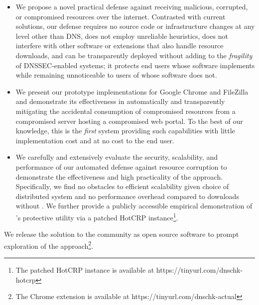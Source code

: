 \begin{itemize}

  \item We propose a novel practical defense against receiving malicious,
  corrupted, or compromised resources over the internet. Contrasted with current
  solutions, our defense requires no source code or infrastructure changes at
  any level other than DNS, does not employ unreliable heuristics, does not
  interfere with other software or extensions that also handle resource
  downloads, and can be transparently deployed without adding to the
  \textit{fragility} of DNSSEC-enabled systems; it protects end users whose
  software implements \SYSTEM{} while remaining unnoticeable to users of whose
  software does not.

  \item We present our prototype \SYSTEM{} implementations for Google Chrome and
  FileZilla and demonstrate its effectiveness in automatically and transparently
  mitigating the accidental consumption of compromised resources from a
  compromised server hosting a compromised web portal. To the best of our
  knowledge, this is the \emph{first} system providing such capabilities with
  little implementation cost and at no cost to the end user.

  \item We carefully and extensively evaluate the security, scalability, and
  performance of our automated defense against resource corruption to
  demonstrate the effectiveness and high practicality of the \SYSTEM{} approach.
  Specifically, we find no obstacles to efficient scalability given choice of
  distributed system and no performance overhead compared to downloads without
  \SYSTEM{}. We further provide a publicly accessible empirical demonstration of
  \SYSTEM{}'s protective utility via a patched HotCRP instance\footnote{The
  patched HotCRP instance is available at https://tinyurl.com/dnschk-hotcrp}.

\end{itemize}

We release the \SYSTEM{} solution to the community as open source software to
prompt exploration of the \SYSTEM{} approach\footnote{The \SYSTEM{} Chrome
extension is available at https://tinyurl.com/dnschk-actual}.
